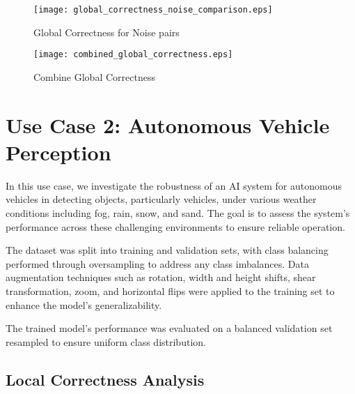 

\begin{figure}[H]
  \centering
  \texttt{[image: global\_correctness\_noise\_comparison.eps]}
  \caption{Global Correctness for Noise pairs}
  \label{fig:global_correctness_noise_shap}
\end{figure}


\begin{figure}[H]
  \centering
  \texttt{[image: combined\_global\_correctness.eps]}
  \caption{Combine Global Correctness}
  \label{fig:combine_global_correctness}
\end{figure}
\section{Use Case 2: Autonomous Vehicle Perception}

In this use case, we investigate the robustness of an AI system for autonomous vehicles in detecting objects, particularly vehicles, under various weather conditions including fog, rain, snow, and sand. The goal is to assess the system's performance across these challenging environments to ensure reliable operation.

The dataset was split into training and validation sets, with class balancing performed through oversampling to address any class imbalances. Data augmentation techniques such as rotation, width and height shifts, shear transformation, zoom, and horizontal flips were applied to the training set to enhance the model's generalizability.

The trained model's performance was evaluated on a balanced validation set resampled to ensure uniform class distribution.

\subsection{Local Correctness Analysis}

